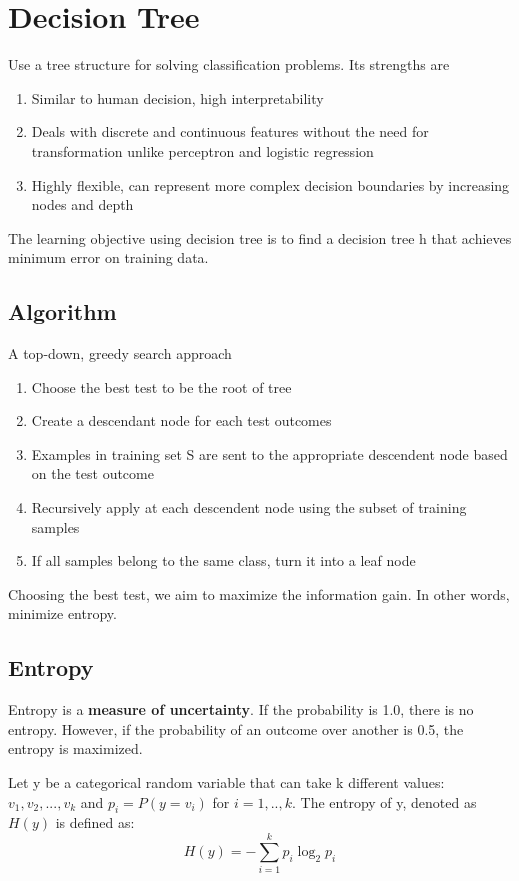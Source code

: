 \documentclass[11pt]{article}
\begin{document}
\section{Decision Tree}
\label{sec:org33b79f1}
Use a tree structure for solving classification problems. Its strengths are 
\begin{enumerate}
\item Similar to human decision, high interpretability
\item Deals with discrete and continuous features without the need for transformation unlike perceptron and logistic regression
\item Highly flexible, can represent more complex decision boundaries by increasing nodes and depth
\end{enumerate}
The learning objective using decision tree is to find a decision tree h that achieves minimum error on training data. 
\subsection{Algorithm}
\label{sec:org3870dab}
A top-down, greedy search approach
\begin{enumerate}
\item Choose the best test to be the root of tree
\item Create a descendant node for each test outcomes
\item Examples in training set S are sent to the appropriate descendent node based on the test outcome
\item Recursively apply at each descendent node using the subset of training samples
\item If all samples belong to the same class, turn it into a leaf node
\end{enumerate}

Choosing the best test, we aim to maximize the information gain. In other words, minimize entropy.

\subsection{Entropy}
\label{sec:orgc1d794a}
Entropy is a \textbf{\textbf{measure of uncertainty}}. If the probability is 1.0, there is no entropy. However, if the probability of an outcome over another is 0.5, the entropy is maximized.

Let y be a categorical random variable that can take k different values: \(v_1, v_2,...,v_k\) and \(p_i=P(y=v_i)\)  for \(i=1,..,k\). The entropy of y, denoted as \(H(y)\) is defined as: 
$$
H ( y ) = - \sum _ { i = 1} ^ { k } p _ { i } \log _ { 2} p _ { i }
$$
\end{document}
